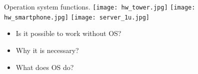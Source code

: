 \begin{frame}{Operation system functions.}
\texttt{[image: hw\_tower.jpg]} 
\texttt{[image: hw\_smartphone.jpg]}
\texttt{[image: server\_1u.jpg]}
	\begin{itemize}
            \item Is it possible to work without OS?
            \item Why it is necessary?
	    \item What does OS do?
	\end{itemize}
\end{frame}


